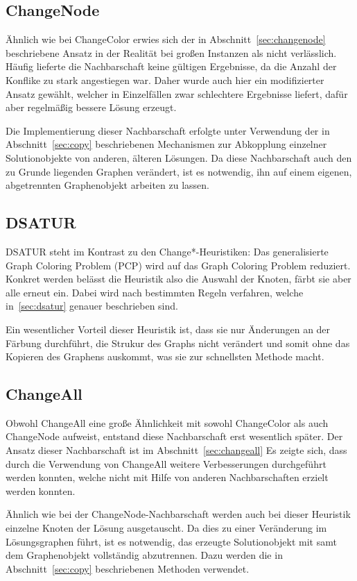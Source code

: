 \subsection{ChangeNode}
Ähnlich wie bei ChangeColor erwies sich der in Abschnitt~\ref{sec:changenode} beschriebene Ansatz in der Realität bei großen Instanzen als nicht verlässlich. Häufig lieferte die Nachbarschaft keine gültigen
Ergebnisse, da die Anzahl der Konflike zu stark angestiegen war. Daher wurde auch hier ein modifizierter Ansatz gewählt, welcher in Einzelfällen zwar schlechtere Ergebnisse liefert, dafür aber regelmäßig
bessere Lösung erzeugt.

Die Implementierung dieser Nachbarschaft erfolgte unter Verwendung der in Abschnitt~\ref{sec:copy} beschriebenen Mechanismen zur Abkopplung einzelner Solutionobjekte von anderen, älteren Lösungen. Da diese 
Nachbarschaft auch den zu Grunde liegenden Graphen verändert, ist es notwendig, ihn auf einem eigenen, abgetrennten Graphenobjekt arbeiten zu lassen. 

\subsection{DSATUR}
DSATUR steht im Kontrast zu den Change*-Heuristiken: Das generalisierte Graph Coloring Problem (PCP) wird auf das Graph Coloring Problem reduziert. Konkret werden belässt die Heuristik also die Auswahl der Knoten, färbt sie aber alle erneut ein. Dabei wird nach bestimmten Regeln verfahren, welche in~\ref{sec:dsatur} genauer beschrieben sind.

Ein wesentlicher Vorteil dieser Heuristik ist, dass sie nur Änderungen an der Färbung durchführt, die Strukur des Graphs nicht verändert und somit ohne das Kopieren des Graphens auskommt, was sie zur schnellsten Methode macht.

\subsection{ChangeAll}
Obwohl ChangeAll eine große Ähnlichkeit mit sowohl ChangeColor als auch ChangeNode aufweist, entstand diese Nachbarschaft erst wesentlich später. 
Der Ansatz dieser Nachbarschaft ist im Abschnitt~\ref{sec:changeall}
Es zeigte sich, dass durch die Verwendung von ChangeAll weitere Verbesserungen durchgeführt werden konnten, welche nicht mit Hilfe von anderen 
Nachbarschaften erzielt werden konnten.

Ähnlich wie bei der ChangeNode-Nachbarschaft werden auch bei dieser Heuristik einzelne Knoten der Lösung ausgetauscht. Da dies zu einer Veränderung im Lösungsgraphen führt, ist es notwendig, das erzeugte
Solutionobjekt mit samt dem Graphenobjekt vollständig abzutrennen. Dazu werden die in Abschnitt~\ref{sec:copy} beschriebenen Methoden verwendet.

